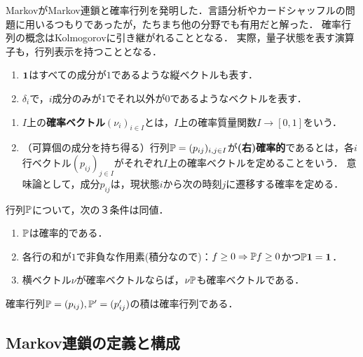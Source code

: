 \documentclass[uplatex,dvipdfmx]{jsreport}
\begin{document}
\begin{history}
    MarkovがMarkov連鎖と確率行列を発明した．言語分析やカードシャッフルの問題に用いるつもりであったが，たちまち他の分野でも有用だと解った．
    確率行列の概念はKolmogorovに引き継がれることとなる．
    実際，量子状態を表す演算子も，行列表示を持つこととなる．
\end{history}

\begin{notation}\mbox{}
    \begin{enumerate}
        \item $\mathbf{1}$はすべての成分が$1$であるような縦ベクトルも表す．
        \item $\delta_i$で，$i$成分のみが$1$でそれ以外が$0$であるようなベクトルを表す．
    \end{enumerate}
\end{notation}

\begin{definition}\mbox{}
    \begin{enumerate}
        \item $I$上の\textbf{確率ベクトル}$(\nu_i)_{i\in I}$とは，$I$上の確率質量関数$I\to[0,1]$をいう．
        \item （可算個の成分を持ち得る）行列$\mathbb{P}=(p_{ij})_{i,j\in I}$が\textbf{(右)確率的}であるとは，各$i$行ベクトル$(p_{ij})_{j\in I}$がそれぞれ$I$上の確率ベクトルを定めることをいう．
        意味論として，成分$p_{ij}$は，現状態$i$から次の時刻$j$に遷移する確率を定める．
    \end{enumerate}
\end{definition}

\begin{lemma}[確率行列の特徴付け]
    行列$\mathbb{P}$について，次の３条件は同値．
    \begin{enumerate}
        \item $\mathbb{P}$は確率的である．
        \item 各行の和が$1$で非負な作用素(積分なので)：$f\ge0\Rightarrow\mathbb{P} f\ge0$かつ$\mathbb{P}\mathbf{1}=\mathbf{1}$．
        \item 横ベクトル$\nu$が確率ベクトルならば，$\nu\mathbb{P}$も確率ベクトルである．
    \end{enumerate}
\end{lemma}

\begin{lemma}[確率行列は群をなす？]
    確率行列$\mathbb{P}=(p_{ij}),\mathbb{P}'=(p'_{ij})$の積は確率行列である．
\end{lemma}

\subsection{Markov連鎖の定義と構成}
\end{document}
